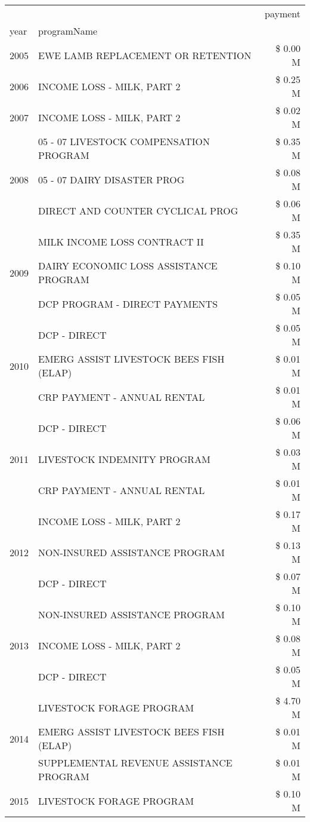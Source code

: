 \begin{tabular}{llr}
\toprule
 &  & payment \\
year & programName &  \\
\midrule
2005 & EWE LAMB REPLACEMENT OR RETENTION & \$ 0.00 M \\
\cline{1-3}
2006 & INCOME LOSS - MILK, PART 2 & \$ 0.25 M \\
\cline{1-3}
2007 & INCOME LOSS - MILK, PART 2 & \$ 0.02 M \\
\cline{1-3}
\multirow[t]{3}{*}{2008} & 05 - 07 LIVESTOCK COMPENSATION PROGRAM & \$ 0.35 M \\
 & 05 - 07 DAIRY DISASTER PROG & \$ 0.08 M \\
 & DIRECT AND COUNTER CYCLICAL PROG & \$ 0.06 M \\
\cline{1-3}
\multirow[t]{3}{*}{2009} & MILK INCOME LOSS CONTRACT II & \$ 0.35 M \\
 & DAIRY ECONOMIC LOSS ASSISTANCE PROGRAM & \$ 0.10 M \\
 & DCP PROGRAM - DIRECT PAYMENTS & \$ 0.05 M \\
\cline{1-3}
\multirow[t]{3}{*}{2010} & DCP - DIRECT & \$ 0.05 M \\
 & EMERG ASSIST LIVESTOCK BEES FISH (ELAP) & \$ 0.01 M \\
 & CRP PAYMENT - ANNUAL RENTAL & \$ 0.01 M \\
\cline{1-3}
\multirow[t]{3}{*}{2011} & DCP - DIRECT & \$ 0.06 M \\
 & LIVESTOCK INDEMNITY PROGRAM & \$ 0.03 M \\
 & CRP PAYMENT - ANNUAL RENTAL & \$ 0.01 M \\
\cline{1-3}
\multirow[t]{3}{*}{2012} & INCOME LOSS - MILK, PART 2 & \$ 0.17 M \\
 & NON-INSURED ASSISTANCE PROGRAM & \$ 0.13 M \\
 & DCP - DIRECT & \$ 0.07 M \\
\cline{1-3}
\multirow[t]{3}{*}{2013} & NON-INSURED ASSISTANCE PROGRAM & \$ 0.10 M \\
 & INCOME LOSS - MILK, PART 2 & \$ 0.08 M \\
 & DCP - DIRECT & \$ 0.05 M \\
\cline{1-3}
\multirow[t]{3}{*}{2014} & LIVESTOCK FORAGE PROGRAM & \$ 4.70 M \\
 & EMERG ASSIST LIVESTOCK BEES FISH (ELAP) & \$ 0.01 M \\
 & SUPPLEMENTAL REVENUE ASSISTANCE PROGRAM & \$ 0.01 M \\
\cline{1-3}
\multirow[t]{3}{*}{2015} & LIVESTOCK FORAGE PROGRAM & \$ 0.10 M \\

\end{tabular}
